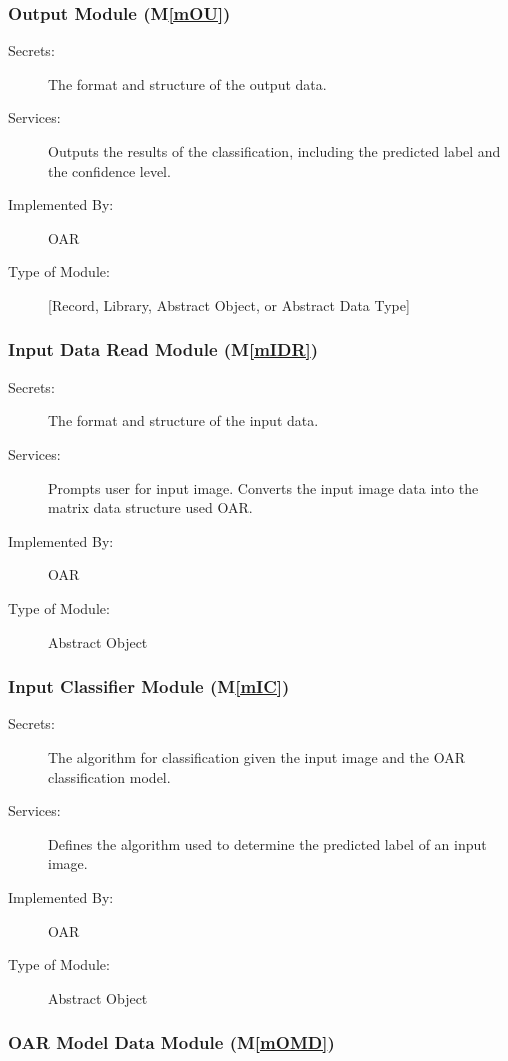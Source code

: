 \documentclass[12pt, titlepage]{article}
\newcommand{\mref}[1]{M\ref{#1}}
\begin{document}
\subsubsection{Output Module (\mref{mOU})}

\begin{description}
\item[Secrets:] The format and structure of the output data.
\item[Services:] Outputs the results of the classification, including the predicted label and the confidence level.
\item[Implemented By:] OAR
\item[Type of Module:] [Record, Library, Abstract Object, or Abstract Data Type]
\end{description}

\subsubsection{Input Data Read Module (\mref{mIDR})}

\begin{description}
\item[Secrets:] The format and structure of the input data.
\item[Services:] Prompts user for input image. Converts the input image data into the matrix data structure used OAR.
\item[Implemented By:] OAR
\item[Type of Module:] Abstract Object
\end{description}

\subsubsection{Input Classifier Module (\mref{mIC})}

\begin{description}
\item[Secrets:] The algorithm for classification given the input image and the OAR classification model.
\item[Services:] Defines the algorithm used to determine the predicted label of an input image.
\item[Implemented By:] OAR
\item[Type of Module:] Abstract Object
\end{description}

\subsubsection{OAR Model Data Module (\mref{mOMD})}
\end{document}
